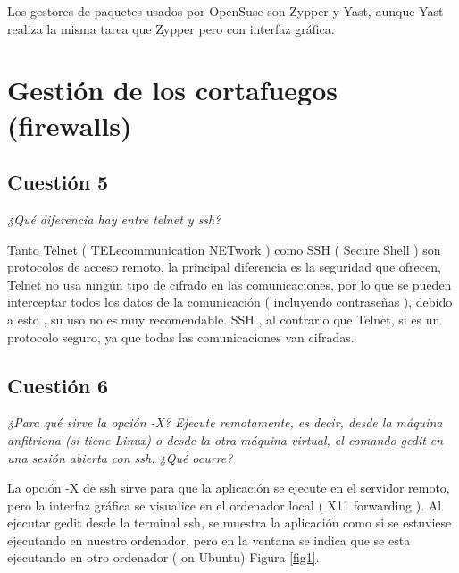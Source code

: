 Los gestores de paquetes usados por OpenSuse son Zypper y Yast, aunque Yast realiza la misma tarea que Zypper pero con interfaz gráfica. \cite{os1} \cite{os2} \cite{os3}





\section{Gestión de los cortafuegos (firewalls)}
\subsection{Cuestión 5}
\textit{¿Qué diferencia hay entre telnet y ssh?}
\newline

Tanto Telnet ( TELecommunication NETwork ) como SSH ( Secure Shell ) son protocolos de acceso remoto, la principal diferencia es la seguridad que ofrecen, Telnet no usa ningún tipo de cifrado en las comunicaciones, por lo que se pueden interceptar todos los datos de la comunicación ( incluyendo contraseñas ), debido a esto , su uso no es muy recomendable. SSH , al contrario que Telnet, si es un protocolo seguro, ya que todas las comunicaciones van cifradas.  \cite{sshtle}





\subsection{Cuestión 6}
\textit{¿Para qué sirve la opción -X? Ejecute remotamente, es decir, desde la máquina anfitriona (si tiene Linux) o desde la otra máquina virtual, el comando gedit en una sesión abierta con ssh. ¿Qué ocurre?}
\newline

La opción -X de ssh sirve para que la aplicación se ejecute en el servidor remoto, pero la interfaz gráfica se visualice en el ordenador local ( X11 forwarding ). \cite{sshx} Al ejecutar gedit desde la terminal ssh, se muestra la aplicación como si se estuviese ejecutando en nuestro ordenador, pero en la ventana se indica que se esta ejecutando en otro ordenador ( on Ubuntu) Figura \ref{fig1}. 

